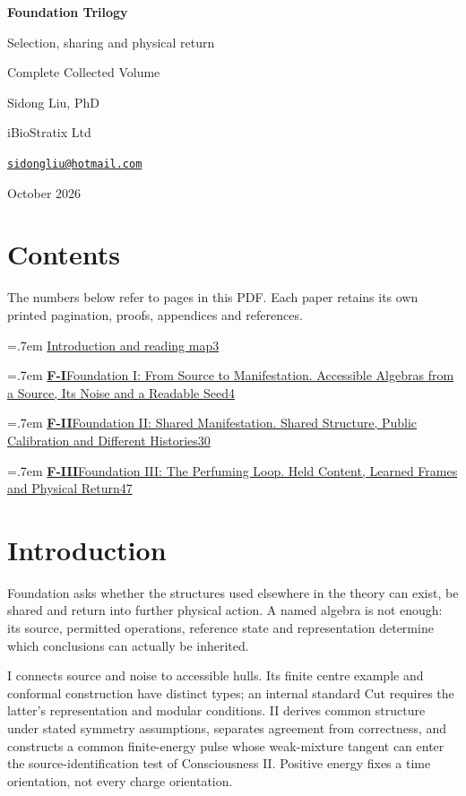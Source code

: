\documentclass[11pt,a4paper]{article}
\newcommand{\volumeentry}[3]{\par\begingroup\parskip=.7em
  \noindent\href{Foundation_Trilogy_Complete_Collection.pdf\#page=#3}{\textbf{#1}\quad #2\nobreak\dotfill\nobreak\mbox{#3}}\par\endgroup}
\begin{document}
\begin{titlepage}
\centering
\vspace*{1.6cm}
{\Huge\bfseries Foundation Trilogy\par}
\vspace{1cm}
{\Large Selection, sharing and physical return\par}
\vfill
{\Large Complete Collected Volume\par}
\vspace{1.6cm}
{\Large Sidong Liu, PhD\par}
\vspace{.3cm}
{iBioStratix Ltd\par}
\href{mailto:sidongliu@hotmail.com}{\texttt{sidongliu@hotmail.com}}\par
\vspace{1cm}
{\large October 2026\par}
\end{titlepage}
\setcounter{page}{2}
\section*{Contents}
The numbers below refer to pages in this PDF. Each paper retains its own printed pagination, proofs, appendices and references.
\volumeentry{}{Introduction and reading map}{3}
\volumeentry{F-I}{Foundation I: From Source to Manifestation. Accessible Algebras from a Source, Its Noise and a Readable Seed}{4}
\volumeentry{F-II}{Foundation II: Shared Manifestation. Shared Structure, Public Calibration and Different Histories}{30}
\volumeentry{F-III}{Foundation III: The Perfuming Loop. Held Content, Learned Frames and Physical Return}{47}
\clearpage
\section*{Introduction}\label{collection:intro}
Foundation asks whether the structures used elsewhere in the theory can exist, be shared and return into further physical action. A named algebra is not enough: its source, permitted operations, reference state and representation determine which conclusions can actually be inherited.

I connects source and noise to accessible hulls. Its finite centre example and conformal construction have distinct types; an internal standard Cut requires the latter's representation and modular conditions. II derives common structure under stated symmetry assumptions, separates agreement from correctness, and constructs a common finite-energy pulse whose weak-mixture tangent can enter the source-identification test of Consciousness II. Positive energy fixes a time orientation, not every charge orientation.
\end{document}
